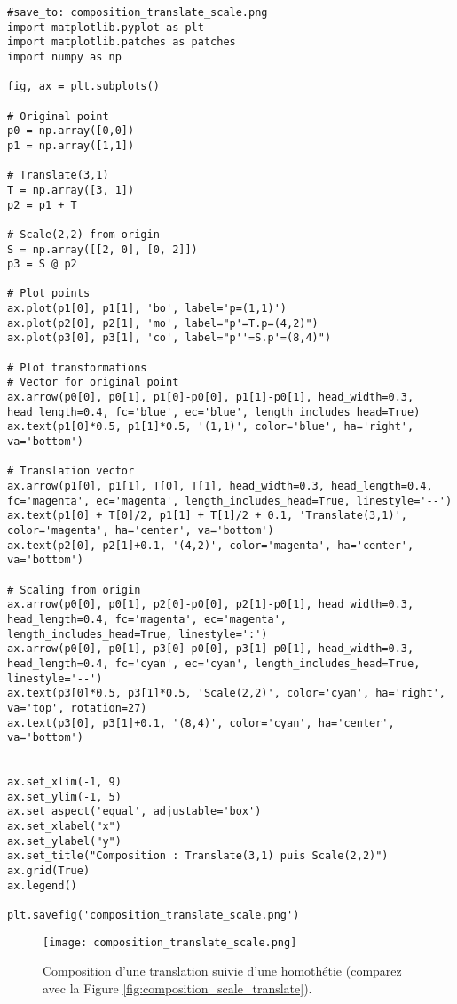 \documentclass{article}
\begin{document}
\begin{verbatim}
#save_to: composition_translate_scale.png
import matplotlib.pyplot as plt
import matplotlib.patches as patches
import numpy as np

fig, ax = plt.subplots()

# Original point
p0 = np.array([0,0])
p1 = np.array([1,1])

# Translate(3,1)
T = np.array([3, 1])
p2 = p1 + T

# Scale(2,2) from origin
S = np.array([[2, 0], [0, 2]])
p3 = S @ p2

# Plot points
ax.plot(p1[0], p1[1], 'bo', label='p=(1,1)')
ax.plot(p2[0], p2[1], 'mo', label="p'=T.p=(4,2)")
ax.plot(p3[0], p3[1], 'co', label="p''=S.p'=(8,4)")

# Plot transformations
# Vector for original point
ax.arrow(p0[0], p0[1], p1[0]-p0[0], p1[1]-p0[1], head_width=0.3, head_length=0.4, fc='blue', ec='blue', length_includes_head=True)
ax.text(p1[0]*0.5, p1[1]*0.5, '(1,1)', color='blue', ha='right', va='bottom')

# Translation vector
ax.arrow(p1[0], p1[1], T[0], T[1], head_width=0.3, head_length=0.4, fc='magenta', ec='magenta', length_includes_head=True, linestyle='--')
ax.text(p1[0] + T[0]/2, p1[1] + T[1]/2 + 0.1, 'Translate(3,1)', color='magenta', ha='center', va='bottom')
ax.text(p2[0], p2[1]+0.1, '(4,2)', color='magenta', ha='center', va='bottom')

# Scaling from origin
ax.arrow(p0[0], p0[1], p2[0]-p0[0], p2[1]-p0[1], head_width=0.3, head_length=0.4, fc='magenta', ec='magenta', length_includes_head=True, linestyle=':')
ax.arrow(p0[0], p0[1], p3[0]-p0[0], p3[1]-p0[1], head_width=0.3, head_length=0.4, fc='cyan', ec='cyan', length_includes_head=True, linestyle='--')
ax.text(p3[0]*0.5, p3[1]*0.5, 'Scale(2,2)', color='cyan', ha='right', va='top', rotation=27)
ax.text(p3[0], p3[1]+0.1, '(8,4)', color='cyan', ha='center', va='bottom')


ax.set_xlim(-1, 9)
ax.set_ylim(-1, 5)
ax.set_aspect('equal', adjustable='box')
ax.set_xlabel("x")
ax.set_ylabel("y")
ax.set_title("Composition : Translate(3,1) puis Scale(2,2)")
ax.grid(True)
ax.legend()

plt.savefig('composition_translate_scale.png')
\end{verbatim}

\begin{figure}[H]
\centering
\texttt{[image: composition\_translate\_scale.png]}
\caption{Composition d'une translation suivie d'une homothétie (comparez avec la Figure \ref{fig:composition_scale_translate}).}
\label{fig:composition_translate_scale}
\end{figure}
\end{document}
